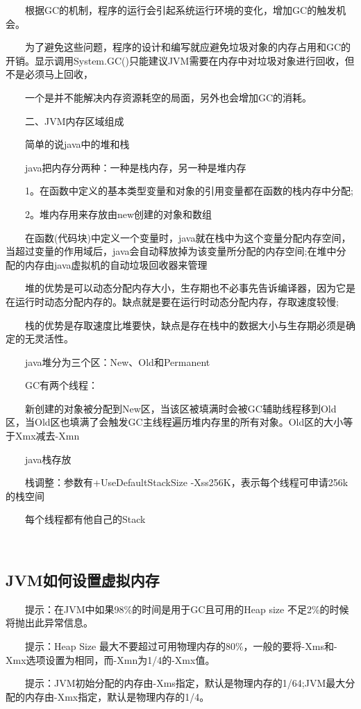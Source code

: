 \documentclass[a4paper, 11pt]{article}
\begin{document}
　　根据GC的机制，程序的运行会引起系统运行环境的变化，增加GC的触发机会。

　　为了避免这些问题，程序的设计和编写就应避免垃圾对象的内存占用和GC的开销。显示调用System.GC()只能建议JVM需要在内存中对垃圾对象进行回收，但不是必须马上回收，

　　一个是并不能解决内存资源耗空的局面，另外也会增加GC的消耗。

　　二、JVM内存区域组成

　　简单的说java中的堆和栈

　　java把内存分两种：一种是栈内存，另一种是堆内存

　　1。在函数中定义的基本类型变量和对象的引用变量都在函数的栈内存中分配;

　　2。堆内存用来存放由new创建的对象和数组

　　在函数(代码块)中定义一个变量时，java就在栈中为这个变量分配内存空间，当超过变量的作用域后，java会自动释放掉为该变量所分配的内存空间;在堆中分配的内存由java虚拟机的自动垃圾回收器来管理

　　堆的优势是可以动态分配内存大小，生存期也不必事先告诉编译器，因为它是在运行时动态分配内存的。缺点就是要在运行时动态分配内存，存取速度较慢;

　　栈的优势是存取速度比堆要快，缺点是存在栈中的数据大小与生存期必须是确定的无灵活性。

　　java堆分为三个区：New、Old和Permanent

　　GC有两个线程：

　　新创建的对象被分配到New区，当该区被填满时会被GC辅助线程移到Old区，当Old区也填满了会触发GC主线程遍历堆内存里的所有对象。Old区的大小等于Xmx减去-Xmn

　　java栈存放

　　栈调整：参数有+UseDefaultStackSize -Xss256K，表示每个线程可申请256k的栈空间

　　每个线程都有他自己的Stack

　　\subsection{JVM如何设置虚拟内存}

　　提示：在JVM中如果98\%的时间是用于GC且可用的Heap size 不足2\%的时候将抛出此异常信息。

　　提示：Heap Size 最大不要超过可用物理内存的80\%，一般的要将-Xms和-Xmx选项设置为相同，而-Xmn为1/4的-Xmx值。

　　提示：JVM初始分配的内存由-Xms指定，默认是物理内存的1/64;JVM最大分配的内存由-Xmx指定，默认是物理内存的1/4。
\end{document}
